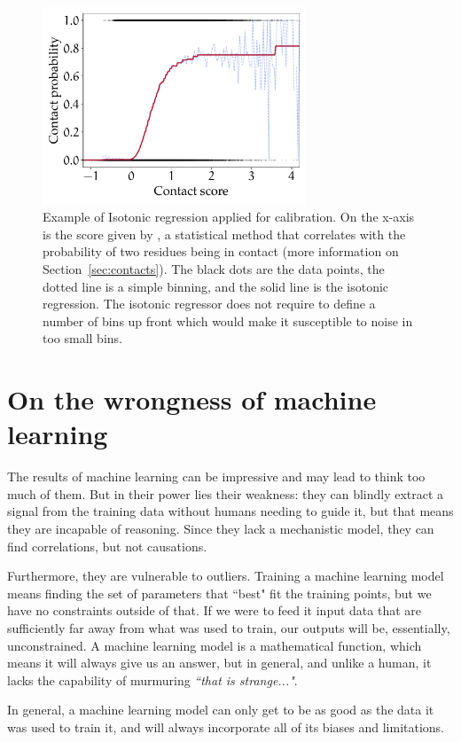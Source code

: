 \begin{figure}[hbt]
	\centering
	\includegraphics[width=0.7\textwidth]{machine_learning/figures/isotonic}
	\caption{Example of Isotonic regression applied for calibration.
	On the x-axis is the score given by \GaussDCA, a statistical method that correlates with the probability of two residues being in contact (more information on Section~\ref{sec:contacts}).
	The black dots are the data points, the dotted line is a simple binning, and the solid line is the isotonic regression.
	The isotonic regressor does not require to define a number of bins up front which would make it susceptible to noise in too small bins.}\label{fig:isotonic}
\end{figure}



\section{On the wrongness of machine learning}\label{sec:wrong}
The results of machine learning can be impressive and may lead to think too much of them.
But in their power lies their weakness: they can blindly extract a signal from the training data without humans needing to guide it, but that means they are incapable of reasoning.
Since they lack a mechanistic model, they can find correlations, but not causations.

Furthermore, they are vulnerable to outliers.
Training a machine learning model means finding the set of parameters that ``best" fit the training points, but we have no constraints outside of that.
If we were to feed it input data that are sufficiently far away from what was used to train, our outputs will be, essentially, unconstrained.
A machine learning model is a mathematical function, which means it will always give us an answer, but in general, and unlike a human, it lacks the capability of murmuring \emph{``that is strange..."}.

In general, a machine learning model can only get to be as good as the data it was used to train it, and will always incorporate all of its biases and limitations.


